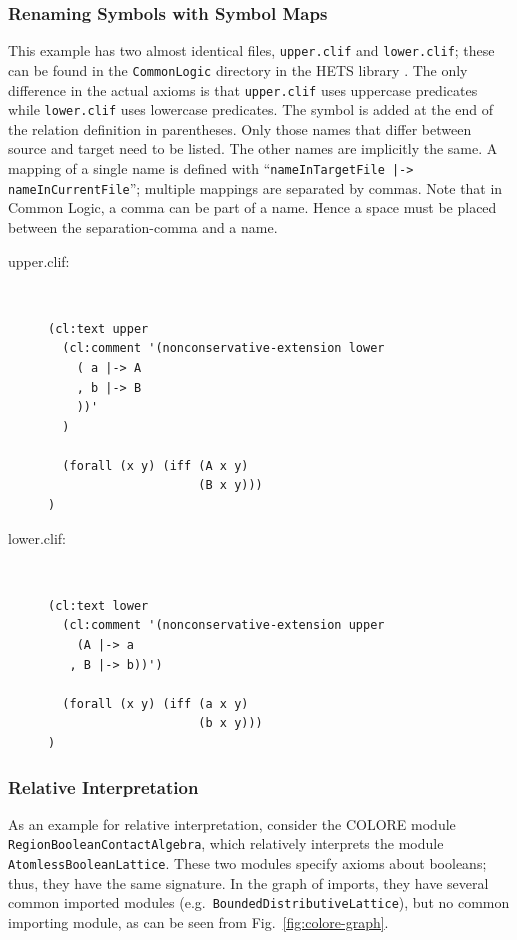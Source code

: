 \documentclass{article}
\newcommand{\normalTEXTSC}[2]{{#1\scriptsize#2}}
\newcommand     {\Hets}{\normalTEXTSC{H}{ETS}\xspace}
\begin{document}
\subsubsection{Renaming Symbols with Symbol Maps}
\label{sec:renam-symb-with}

This example has two almost identical files, \texttt{upper.clif} and 
\texttt{lower.clif}; these can be found in the \texttt{CommonLogic} directory in the \Hets library \cite{hets-library:URL}. The only difference in the actual axioms is that 
\texttt{upper.clif} uses uppercase predicates while \texttt{lower.clif} 
uses lowercase predicates. The symbol is added at the end of the relation
definition in parentheses. Only those names that differ between source
and target need to be listed. The other names are implicitly the same. 
A mapping of a single name is defined with 
``\texttt{nameInTargetFile |-> nameInCurrentFile}''; multiple mappings are 
separated by commas. Note that in Common Logic, a comma can be part of a name.
Hence a space must be placed between the separation-comma and a name.\\

\begin{description}
\item[upper.clif:]~\\
\begin{lstlisting}[language=clif]
(cl:text upper
  (cl:comment '(nonconservative-extension lower
    ( a |-> A
    , b |-> B
    ))'
  )
  
  (forall (x y) (iff (A x y)
                     (B x y)))
)
\end{lstlisting}
\item[lower.clif:]~\\
\begin{lstlisting}[language=clif]
(cl:text lower
  (cl:comment '(nonconservative-extension upper
    (A |-> a
   , B |-> b))')
  
  (forall (x y) (iff (a x y)
                     (b x y)))
)
\end{lstlisting}
\end{description}

\subsubsection{Relative Interpretation}\label{sec:relat-interpr}

As an example for relative interpretation, consider the COLORE \cite{Colore} module \texttt{Region\-Boolean\-Contact\-Algebra}, which relatively interprets the module \texttt{Atomless\-Boolean\-Lattice}.  These two modules specify axioms about booleans; thus, they have the same signature.  In the graph of imports, they have several common imported modules (e.g.\ \texttt{Bounded\-Distributive\-Lattice}), but no common importing module, as can be seen from Fig.~\ref{fig:colore-graph}.
\end{document}
